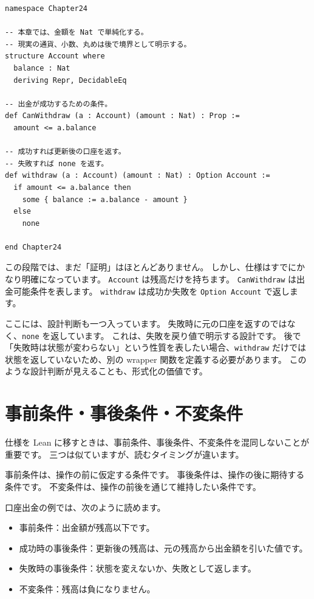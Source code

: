 \begin{listing}[htbp]
\begin{verbatim}
namespace Chapter24

-- 本章では、金額を Nat で単純化する。
-- 現実の通貨、小数、丸めは後で境界として明示する。
structure Account where
  balance : Nat
  deriving Repr, DecidableEq

-- 出金が成功するための条件。
def CanWithdraw (a : Account) (amount : Nat) : Prop :=
  amount <= a.balance

-- 成功すれば更新後の口座を返す。
-- 失敗すれば none を返す。
def withdraw (a : Account) (amount : Nat) : Option Account :=
  if amount <= a.balance then
    some { balance := a.balance - amount }
  else
    none

end Chapter24
\end{verbatim}
\caption{\texttt{Account} と \texttt{withdraw}}
\label{lst:ch24-account-model}
\end{listing}

この段階では、まだ「証明」はほとんどありません。
しかし、仕様はすでにかなり明確になっています。
\texttt{Account} は残高だけを持ちます。
\texttt{CanWithdraw} は出金可能条件を表します。
\texttt{withdraw} は成功か失敗を \texttt{Option Account} で返します。

ここには、設計判断も一つ入っています。
失敗時に元の口座を返すのではなく、\texttt{none} を返しています。
これは、失敗を戻り値で明示する設計です。
後で「失敗時は状態が変わらない」という性質を表したい場合、\texttt{withdraw} だけでは状態を返していないため、別の wrapper 関数を定義する必要があります。
このような設計判断が見えることも、形式化の価値です。

\section{事前条件・事後条件・不変条件}

仕様を Lean に移すときは、事前条件、事後条件、不変条件を混同しないことが重要です。
三つは似ていますが、読むタイミングが違います。

事前条件は、操作の前に仮定する条件です。
事後条件は、操作の後に期待する条件です。
不変条件は、操作の前後を通じて維持したい条件です。

口座出金の例では、次のように読めます。

\begin{itemize}
\item 事前条件：出金額が残高以下です。
\item 成功時の事後条件：更新後の残高は、元の残高から出金額を引いた値です。
\item 失敗時の事後条件：状態を変えないか、失敗として返します。
\item 不変条件：残高は負になりません。
\end{itemize}

